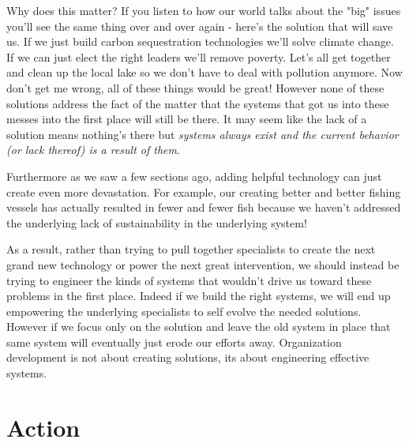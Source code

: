\documentclass[11pt,a5paper]{book}
\begin{document}
Why does this matter? If you listen to how our world talks about the "big" issues you'll see the same thing over and over again - here's the solution that will save us. If we just build carbon sequestration technologies we'll solve climate change. If we can just elect the right leaders we'll remove poverty. Let's all get together and clean up the local lake so we don't have to deal with pollution anymore. Now don't get me wrong, all of these things would be great! However none of these solutions address the fact of the matter that the systems that got us into these messes into the first place will still be there. It may seem like the lack of a solution means nothing's there but \textit{systems always exist and the current behavior (or lack thereof) is a result of them}.
\newline

Furthermore as we saw a few sections ago, adding helpful technology can just create even more devastation. For example, our creating better and better fishing vessels has actually resulted in fewer and fewer fish \cite{meadows} because we haven't addressed the underlying lack of sustainability in the underlying system!
\newline

As a result, rather than trying to pull together specialists to create the next grand new technology or power the next great intervention, we should instead be trying to engineer the kinds of systems that wouldn't drive us toward these problems in the first place. Indeed if we build the right systems, we will end up empowering the underlying specialists to self evolve the needed solutions. However if we focus only on the solution and leave the old system in place that same system will eventually just erode our efforts away. Organization development is not about creating solutions, its about engineering effective systems.

\part{Action}



\end{document}
